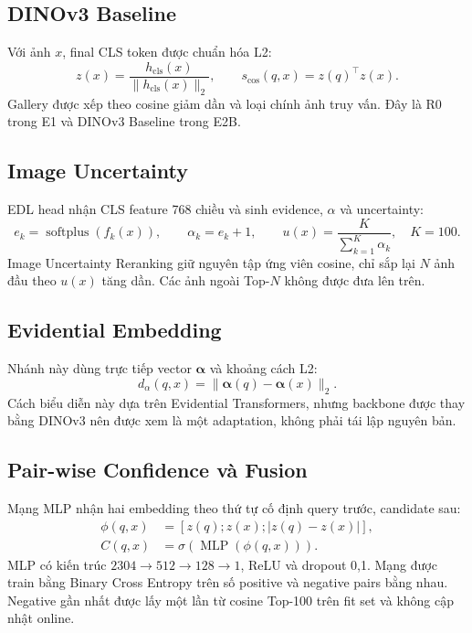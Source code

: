 \documentclass[11pt,a4paper]{article}
\begin{document}
\subsection{DINOv3 Baseline}
Với ảnh $x$, final CLS token được chuẩn hóa L2:
\begin{equation}
 z(x)=\frac{h_{\mathrm{cls}}(x)}{\lVert h_{\mathrm{cls}}(x)\rVert_2},
 \qquad s_{\cos}(q,x)=z(q)^\top z(x).
\end{equation}
Gallery được xếp theo cosine giảm dần và loại chính ảnh truy vấn. Đây là R0
trong E1 và DINOv3 Baseline trong E2B.

\subsection{Image Uncertainty}
EDL head nhận CLS feature 768 chiều và sinh evidence, $\alpha$ và uncertainty:
\begin{equation}
 e_k=\operatorname{softplus}(f_k(x)),\qquad
 \alpha_k=e_k+1,\qquad
 u(x)=\frac{K}{\sum_{k=1}^{K}\alpha_k},\quad K=100.
\end{equation}
Image Uncertainty Reranking giữ nguyên tập ứng viên cosine, chỉ sắp lại $N$ ảnh
đầu theo $u(x)$ tăng dần. Các ảnh ngoài Top-$N$ không được đưa lên trên.

\subsection{Evidential Embedding}
Nhánh này dùng trực tiếp vector $\boldsymbol\alpha$ và khoảng cách L2:
\begin{equation}
 d_{\alpha}(q,x)=\lVert\boldsymbol\alpha(q)-\boldsymbol\alpha(x)\rVert_2.
\end{equation}
Cách biểu diễn này dựa trên Evidential Transformers, nhưng backbone được thay
bằng DINOv3 nên được xem là một adaptation, không phải tái lập nguyên bản.

\subsection{Pair-wise Confidence và Fusion}
Mạng MLP nhận hai embedding theo thứ tự cố định query trước, candidate sau:
\begin{align}
 \phi(q,x)&=[z(q);z(x);|z(q)-z(x)|],\\
 C(q,x)&=\sigma\!\left(\operatorname{MLP}(\phi(q,x))\right).
\end{align}
MLP có kiến trúc $2304\rightarrow512\rightarrow128\rightarrow1$, ReLU và
dropout 0,1. Mạng được train bằng Binary Cross Entropy trên số positive và
negative pairs bằng nhau. Negative gần nhất được lấy một lần từ cosine
Top-100 trên fit set và không cập nhật online.
\end{document}
